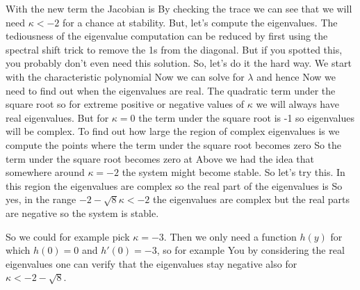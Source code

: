 \solution 
With the new term the Jacobian is 
By checking the trace we can see that we will need $\kappa<-2$ for a chance at stability. But, let's compute the eigenvalues. The tediousness of the eigenvalue computation can be reduced by first using the spectral shift trick to remove the 1s from the diagonal. But if you spotted this, you probably don't even need this solution. So, let's do it the hard way. We start with the characteristic polynomial
Now we can solve for $\lambda$
and hence 
Now we need to find out when the eigenvalues are real. The quadratic term under the square root so for extreme positive or negative values of $\kappa$ we will always have real eigenvalues. But for $\kappa=0$ the term under the square root is -1 so eigenvalues will be complex. To find out how large the region of complex eigenvalues is we compute the points where the term under the square root becomes zero 
So the term under the square root becomes zero at
Above we had the idea that somewhere around $\kappa=-2$ the system might become stable. So let's try this. In this region the eigenvalues are complex so the real part of the eigenvalues is 
So yes, in the range $-2-\sqrt{8}\kappa<-2$ the eigenvalues are complex but the real parts are negative so the system is stable.

So we could for example pick $\kappa=-3$. Then we only need a function $h(y)$ for which $h(0)=0$ and $h'(0)=-3$, so for example 
You by considering the real eigenvalues one can verify that the eigenvalues stay negative also for $\kappa<-2-\sqrt{8}$.
